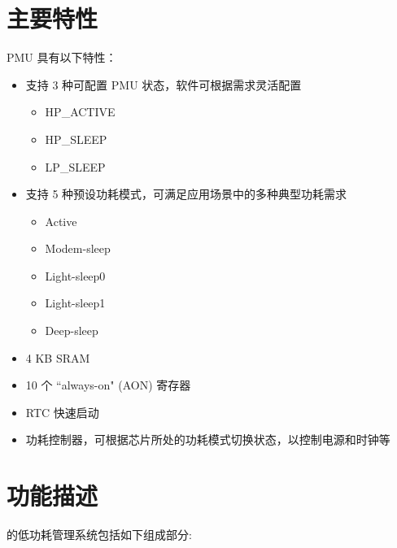 \documentclass[main\_\_CN.tex]{subfiles}
\begin{document}
\section{主要特性}

PMU 具有以下特性：

\begin{itemize}
    \item 支持 3 种可配置 PMU 状态，软件可根据需求灵活配置
    \begin{itemize}
        \item HP\_ACTIVE
        \item HP\_SLEEP
        \item LP\_SLEEP
    \end{itemize}
    \item 支持 5 种预设功耗模式，可满足应用场景中的多种典型功耗需求
    \begin{itemize}
        \item Active
        \item Modem-sleep
        \item Light-sleep0
        \item Light-sleep1
        \item Deep-sleep
    \end{itemize}
    \item 4 KB SRAM
    \item 10 个 ``always-on" (AON) 寄存器
    \item RTC 快速启动
    \item 功耗控制器，可根据芯片所处的功耗模式切换状态，以控制电源和时钟等
\end{itemize}

\section{功能描述}

\chipname{} 的低功耗管理系统包括如下组成部分:
\end{document}

